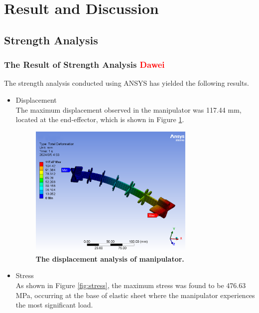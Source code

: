 \section{Result and Discussion} 
\subsection{Strength Analysis}
\subsubsection{The Result of Strength Analysis \textcolor{red}{Dawei}}
The strength analysis conducted using ANSYS has yielded the following results.
\begin{itemize}
    \item Displacement \\
    The maximum displacement observed in the manipulator was 117.44 mm, located at the end-effector, which is shown 
    in Figure \ref{fig:displacement}.
    \begin{figure}[H] %
        \centering 
        \captionsetup{labelsep=colon}
        \includegraphics[width=0.75\textwidth]{Image/Result/displacement.png} 
        \caption[The displacement analysis of manipulator]
        {\centering \textbf{The displacement analysis of manipulator.}}
        \label{fig:displacement}
    \end{figure}
    \item Stress \\
    As shown in Figure \ref{fig:stress}, the maximum stress was found to be 476.63 MPa, occurring at the base of 
    elastic sheet where the manipulator experiences the most significant load. 
    \begin{figure}[H] %

\end{figure}
\end{itemize}
